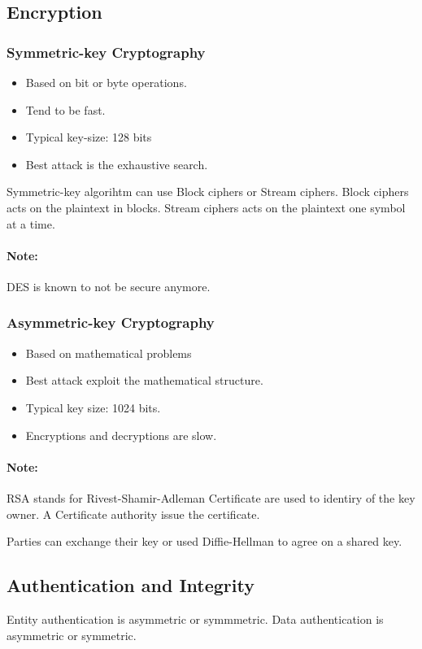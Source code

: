 \subsection{Encryption}
\subsubsection{Symmetric-key Cryptography}
\begin{itemize}
    \item Based on bit or byte operations.
    \item Tend to be fast.
    \item Typical key-size: 128 bits
    \item Best attack is the exhaustive search.
\end{itemize}
Symmetric-key algorihtm can use Block ciphers or Stream ciphers. Block ciphers
acts on the plaintext in blocks. Stream ciphers acts on the plaintext one
symbol at a time.
\paragraph{Note:} DES is known to not be secure anymore.
\subsubsection{Asymmetric-key Cryptography}
\begin{itemize}
    \item Based on mathematical problems
    \item Best attack exploit the mathematical structure.
    \item Typical key size: 1024 bits.
    \item Encryptions and decryptions are slow.
\end{itemize}
\paragraph{Note:} RSA stands for Rivest-Shamir-Adleman
Certificate are used to identiry of the key owner. A Certificate authority
issue the certificate.

Parties can exchange their key or used Diffie-Hellman to agree on a shared key.

\subsection{Authentication and Integrity}
Entity authentication is asymmetric or symmmetric. Data authentication is
asymmetric or symmetric.

